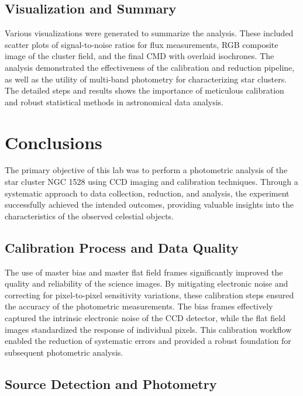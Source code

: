 \documentclass[linenumbers,twocolumn]{aastex631}
\begin{document}
\subsection{Visualization and Summary}

Various visualizations were generated to summarize the analysis. These included scatter plots of signal-to-noise ratios for flux measurements, RGB composite image of the cluster field, and the final CMD with overlaid isochrones. The analysis demonstrated the effectiveness of the calibration and reduction pipeline, as well as the utility of multi-band photometry for characterizing star clusters. The detailed steps and results shows the importance of meticulous calibration and robust statistical methods in astronomical data analysis.

\section{Conclusions} \label{sec:conclusion}

The primary objective of this lab was to perform a photometric analysis of the star cluster NGC 1528 using CCD imaging and calibration techniques. Through a systematic approach to data collection, reduction, and analysis, the experiment successfully achieved the intended outcomes, providing valuable insights into the characteristics of the observed celestial objects.

\subsection{Calibration Process and Data Quality}

The use of master bias and master flat field frames significantly improved the quality and reliability of the science images. By mitigating electronic noise and correcting for pixel-to-pixel sensitivity variations, these calibration steps ensured the accuracy of the photometric measurements. The bias frames effectively captured the intrinsic electronic noise of the CCD detector, while the flat field images standardized the response of individual pixels. This calibration workflow enabled the reduction of systematic errors and provided a robust foundation for subsequent photometric analysis.

\subsection{Source Detection and Photometry}
\end{document}
